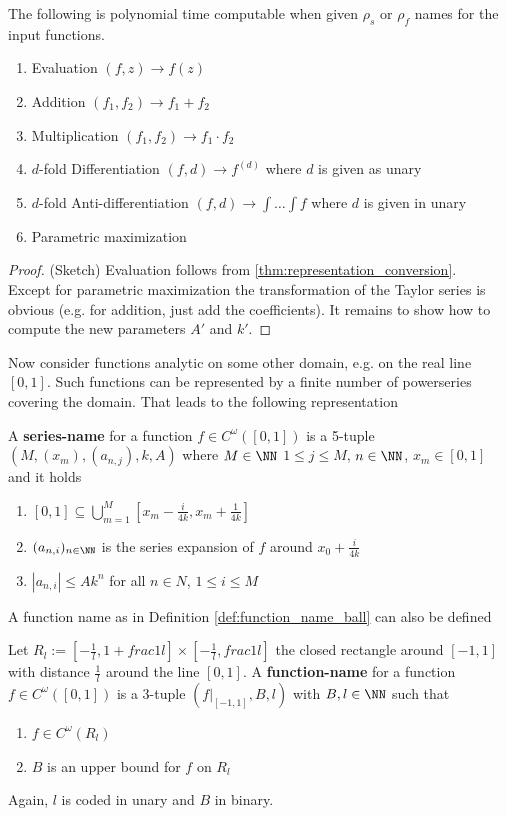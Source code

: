 	 \begin{theorem}\label{thm:polytime_on_ball}
	 	The following is polynomial time computable when given $\rho_s$ or $\rho_f$ names for the input functions.
	 	\begin{enumerate}
	 		\item Evaluation $(f,z) \to f(z)$
	 		\item Addition $(f_1, f_2) \to f_1 + f_2$
	 		\item Multiplication $(f_1, f_2) \to f_1 \cdot f_2$
	 		\item $d$-fold Differentiation $(f,d) \to f^{(d)}$ where $d$ is given as unary
	 		\item $d$-fold Anti-differentiation $(f,d) \to \int \dots \int f$ where $d$ is given in unary
	 		\item Parametric maximization
	 	\end{enumerate}
	 	\begin{proof}(Sketch)
	 		Evaluation follows from \ref{thm:representation_conversion}. \\
	 		Except for parametric maximization the transformation of the Taylor series is obvious (e.g. for addition, just add the coefficients).
	 		It remains to show how to compute the new parameters $A'$ and $k'$. 
	 	\end{proof}
	 \end{theorem}
	Now consider functions analytic on some other domain, e.g. on the real line $[0,1]$.
	Such functions can be represented by a finite number of powerseries covering the domain. 
	That leads to the following representation
	\begin{definition}\label{def:series_name_rect}
		A \textbf{series-name} for a function $f \in C^\omega([0,1])$ is a 5-tuple $(M, (x_m), (a_{n, j}), k, A)$ where $M \in \NN$
		$1 \leq j \leq M$, $n \in \NN$, $x_m \in [0,1]$ and it holds
		\begin{enumerate}
			\item $[0,1] \subseteq \bigcup_{m=1}^M [x_m - \frac{i}{4k}, x_m + \frac{1}{4k}]$
			\item $(a_{n,i})_{n \in \NN}$ is the series expansion of $f$ around $x_0 + \frac{i}{4k}$
			\item $|a_{n,i}| \leq Ak^n$ for all $n \in N$, $1 \leq i \leq M$
		\end{enumerate}
	\end{definition}
	A function name as in Definition \ref{def:function_name_ball} can also be defined
	\begin{definition}
		Let $R_l := [-\frac{1}{l}, 1+frac{1}{l}] \times [-\frac{1}{l}, frac{1}{l}]$ the closed rectangle around $[-1,1]$ 
		with distance $\frac{1}{l}$ around the line $[0,1]$.
		A \textbf{function-name} for a function $f \in C^\omega([0,1])$ is a 3-tuple $(f|_{[-1,1]}, B, l)$ with $B, l \in \NN$ such that 
		\begin{enumerate}
			\item $f \in C^\omega(R_l)$
			\item $B$ is an upper bound for $f$ on $R_l$
		\end{enumerate}
		Again, $l$ is coded in unary and $B$ in binary.
	\end{definition}
